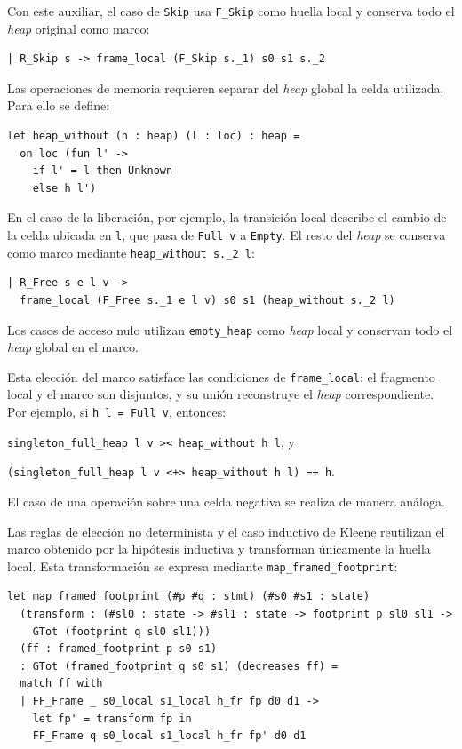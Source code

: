 \documentclass[a4paper,	11pt]{report}
\begin{document}
Con este auxiliar,
el caso de \lstinline|Skip| usa \lstinline|F_Skip| como huella local y conserva todo el \emph{heap} original como marco:

\begin{lstlisting}
| R_Skip s -> frame_local (F_Skip s._1) s0 s1 s._2
\end{lstlisting}

Las operaciones de memoria requieren separar del \emph{heap} global la celda utilizada.
Para ello se define:

\begin{lstlisting}
let heap_without (h : heap) (l : loc) : heap =
  on loc (fun l' ->
    if l' = l then Unknown
    else h l')
\end{lstlisting}
En el caso de la liberación,
por ejemplo,
la transición local describe el cambio de la celda ubicada en \lstinline|l|,
que pasa de \lstinline|Full v| a \lstinline|Empty|.
El resto del \emph{heap} se conserva como marco mediante \lstinline|heap_without s._2 l|:

\begin{lstlisting}
| R_Free s e l v ->
  frame_local (F_Free s._1 e l v) s0 s1 (heap_without s._2 l)
\end{lstlisting}

Los casos de acceso nulo utilizan \lstinline|empty_heap| como \emph{heap} local y conservan todo el \emph{heap} global en el marco.

Esta elección del marco satisface las condiciones de \lstinline|frame_local|:
el fragmento local y el marco son disjuntos,
y su unión reconstruye el \emph{heap} correspondiente.
Por ejemplo,
si \lstinline|h l = Full v|, entonces:
\begin{center}
\lstinline|singleton_full_heap l v >< heap_without h l|, y

\lstinline|(singleton_full_heap l v <+> heap_without h l) == h|.
\end{center}
El caso de una operación sobre una celda negativa se realiza de manera análoga.

Las reglas de elección no determinista y el caso inductivo de Kleene reutilizan el marco obtenido por la hipótesis inductiva
y transforman únicamente la huella local.
Esta transformación se expresa mediante \lstinline|map_framed_footprint|:

\begin{lstlisting}
let map_framed_footprint (#p #q : stmt) (#s0 #s1 : state)
  (transform : (#sl0 : state -> #sl1 : state -> footprint p sl0 sl1 ->
    GTot (footprint q sl0 sl1)))
  (ff : framed_footprint p s0 s1)
  : GTot (framed_footprint q s0 s1) (decreases ff) =
  match ff with
  | FF_Frame _ s0_local s1_local h_fr fp d0 d1 ->
    let fp' = transform fp in
    FF_Frame q s0_local s1_local h_fr fp' d0 d1
\end{lstlisting}
\end{document}
